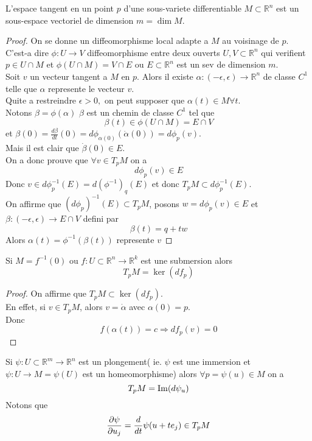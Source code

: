 \documentclass[../main.tex]{subfiles}
\begin{document}
\begin{propo}
L'espace tangent en un point $p$ d'une sous-variete differentiable $ M \subset  \mathbb{R}^n$ est un sous-espace vectoriel de dimension $m = \dim M$.
\end{propo}
\begin{proof}
On se donne un diffeomorphisme local adapte a $M$ au voisinage de $p$.\\
C'est-a dire $\phi: U\to V$ diffeomorphisme entre deux ouverts $U, V \subset \mathbb{R}^n$ qui verifient $p\in U\cap M$ et $\phi( U\cap M) = V\cap E$ ou $E\subset \mathbb{R}^n$ est un sev de dimension $m$.\\
Soit $v$ un vecteur tangent a $M$ en $p$. Alors il existe $\alpha: ( -\epsilon, \epsilon) \to \mathbb{R}^n$ de classe $C^{1}$ telle que $\alpha$ represente le vecteur $v$.\\
Quite a restreindre $\epsilon>0,$ on peut supposer que $\alpha( t) \in M\forall t $.\\
Notons $\beta= \phi( \alpha) $ $\beta$ est un chemin de classe $C^{1}$ tel que 
\[ 
\beta( t) \in \phi( U\cap M) = E\cap V
\]
et $\beta( 0) = \frac{d\beta}{dt}( 0) = d\phi_{\alpha( 0) } ( \dot{\alpha}( 0)) = d\phi_p( v)   $.\\
Mais il est clair que $\dot \beta( 0) \in E$.\\
On a donc prouve que $\forall v \in T_p M$ on a 
\[ 
d\phi_p( v) \in E
\]
Donc $v \in d\phi_p^{-1}( E) = d( \phi^{-1})_q( E) $ et donc $T_pM \subset d\phi_p^{-1}( E) $.\\
On affirme que $( d\phi_p)^{-1}( E) \subset T_p M$, posons $w = d\phi_p( v)\in E $ et $\beta: ( -\epsilon,\epsilon) \to E\cap V$ defini par
\[ 
\beta( t) = q+ tw
\]
Alors $\alpha( t) = \phi^{-1}( \beta(t) ) $ represente $v$ 
\end{proof}
\begin{crly}
Si $M= f^{-1}( 0) $ ou $f: U \subset \mathbb{R}^n\to \mathbb{R}^{k}$ est une submersion alors 
\[ 
T_pM = \ker ( df_p) 
\]

\end{crly}
\begin{proof}
On affirme que $T_pM \subset \ker ( df_p) $.\\
En effet, si $v\in T_pM$, alors $v = \dot\alpha$ avec $\alpha( 0) = p$.\\
Donc 
\[ 
f( \alpha( t) ) = c \Rightarrow df_p( v) = 0
\]

\end{proof}
\begin{crly}
Si $\psi:U \subset \mathbb{R}^m\to \mathbb{R}^n $ est un plongement( ie. $\psi$ est une immersion et $\psi:U \to M= \psi( U) $ est un homeomorphisme) alors $\forall p = \psi( u) \in M$ on a
\[ 
T_pM = \operatorname{Im} ( d\psi_u) 
\]
Notons que
\[ 
\frac{\partial \psi}{\partial u_j}= \frac{d}{dt}\psi( u+t e_j) \in T_p M
\]


\end{crly}
\end{document}
